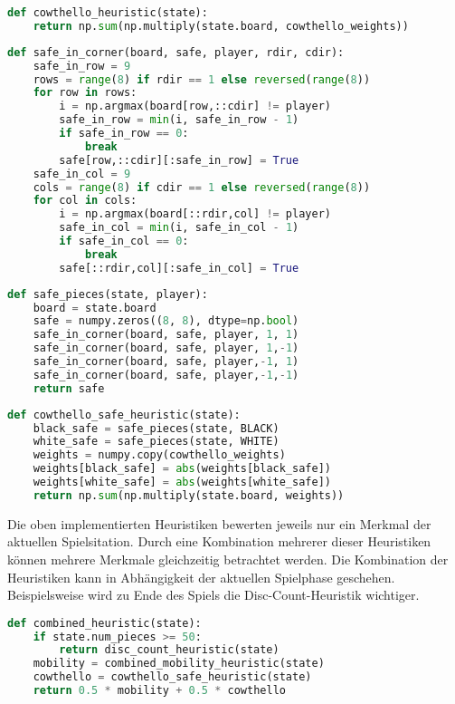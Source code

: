 \begin{lstlisting}[language=Python]
def cowthello_heuristic(state):
    return np.sum(np.multiply(state.board, cowthello_weights))
\end{lstlisting}

\begin{lstlisting}[language=Python]
def safe_in_corner(board, safe, player, rdir, cdir):
    safe_in_row = 9
    rows = range(8) if rdir == 1 else reversed(range(8))
    for row in rows:
        i = np.argmax(board[row,::cdir] != player)
        safe_in_row = min(i, safe_in_row - 1)
        if safe_in_row == 0:
            break
        safe[row,::cdir][:safe_in_row] = True
    safe_in_col = 9
    cols = range(8) if cdir == 1 else reversed(range(8))
    for col in cols:
        i = np.argmax(board[::rdir,col] != player)
        safe_in_col = min(i, safe_in_col - 1)
        if safe_in_col == 0:
            break
        safe[::rdir,col][:safe_in_col] = True
\end{lstlisting}

\begin{lstlisting}[language=Python]
def safe_pieces(state, player):
    board = state.board
    safe = numpy.zeros((8, 8), dtype=np.bool)
    safe_in_corner(board, safe, player, 1, 1)
    safe_in_corner(board, safe, player, 1,-1)
    safe_in_corner(board, safe, player,-1, 1)
    safe_in_corner(board, safe, player,-1,-1)
    return safe
\end{lstlisting}

\begin{lstlisting}[language=Python]
def cowthello_safe_heuristic(state):
    black_safe = safe_pieces(state, BLACK)
    white_safe = safe_pieces(state, WHITE)
    weights = numpy.copy(cowthello_weights)
    weights[black_safe] = abs(weights[black_safe])
    weights[white_safe] = abs(weights[white_safe])
    return np.sum(np.multiply(state.board, weights))
\end{lstlisting}

Die oben implementierten Heuristiken bewerten jeweils nur ein Merkmal
der aktuellen Spielsitation. Durch eine Kombination mehrerer dieser
Heuristiken können mehrere Merkmale gleichzeitig betrachtet werden. Die
Kombination der Heuristiken kann in Abhängigkeit der aktuellen
Spielphase geschehen. Beispielsweise wird zu Ende des Spiels die
Disc-Count-Heuristik wichtiger.

\begin{lstlisting}[language=Python]
def combined_heuristic(state):
    if state.num_pieces >= 50:
        return disc_count_heuristic(state)
    mobility = combined_mobility_heuristic(state)
    cowthello = cowthello_safe_heuristic(state)
    return 0.5 * mobility + 0.5 * cowthello
\end{lstlisting}

